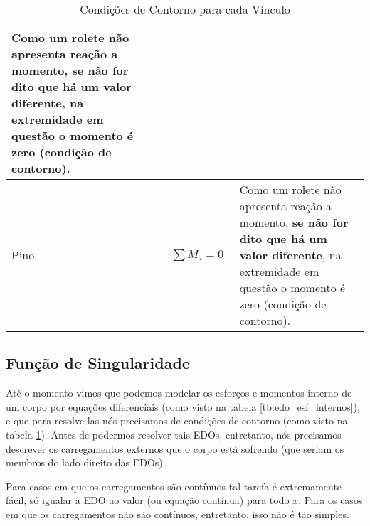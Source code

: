 \documentclass{article}
\begin{document}
\begin{table}[h]
\begin{tabular}{|l|c|l|}
                        \begin{minipage}{.4\textwidth}
                            \vspace{5px}
                            Como um rolete não apresenta reação a momento, \textbf{se não for dito que há um valor diferente}, na extremidade em questão  o momento é zero (condição de contorno).
                        \end{minipage} \\ \hline                       

                    Pino & 
                        \begin{minipage}{.4\textwidth}
                            {\begin{align*}
                                &\sum M_z = 0
                            \end{align*}}
                        \end{minipage} &
                        
                        \begin{minipage}{.4\textwidth}
                            \vspace{5px}
                            Como um rolete não apresenta reação a momento, \textbf{se não for dito que há um valor diferente}, na extremidade em questão o momento é zero (condição de contorno).
                        \end{minipage} \\ \hline    
                \end{tabular}
                \caption{Condições de Contorno para cada Vínculo}
                \label{tb:cond_contorno}
            \end{table}

        \newpage
        \subsection{Função de Singularidade}
            Até o momento vimos que podemos modelar os esforços e momentos interno de um corpo por equações diferenciais (como visto na tabela \ref{tb:edo_esf_internos}), e que para resolve-las
            nós precisamos de condições de contorno (como visto na tabela \ref{tb:cond_contorno}). Antes de podermos resolver tais EDOs, entretanto, nós precisamos descrever os carregamentos
            externos que o corpo está sofrendo (que seriam os membros do lado direito das EDOs).

            Para casos em que os carregamentos são contínuos tal tarefa é extremamente fácil, só igualar a EDO ao valor (ou equação contínua) para todo $x$. Para os casos em que os carregamentos não são contínuos, entretanto, isso não é tão simples.
\end{document}
